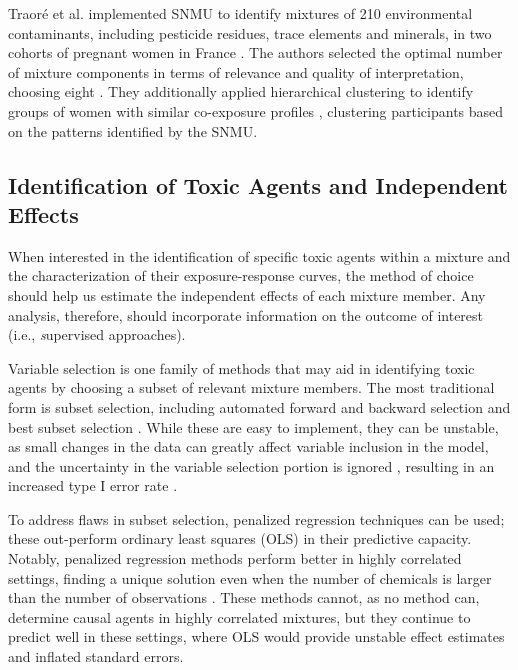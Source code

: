Traor\'{e} et al. implemented SNMU to identify mixtures of 210 environmental contaminants, including pesticide residues, trace elements and minerals, in two cohorts of pregnant women in France \citep{traore2018}. The authors selected the optimal number of mixture components in terms of relevance and quality of interpretation, choosing eight \citep{traore2018}. They additionally applied hierarchical clustering to identify groups of women with similar co-exposure profiles \citep{traore2018}, clustering participants based on the patterns identified by the SNMU.

\subsection{Identification of Toxic Agents and Independent Effects}\label{sec:Ind}

When interested in the identification of specific toxic agents within a mixture and the characterization of their exposure-response curves, the method of choice should help us estimate the independent effects of each mixture member. Any analysis, therefore, should incorporate information on the outcome of interest (i.e., {\textit supervised} approaches).

Variable selection is one family of methods that may aid in identifying toxic agents by choosing a subset of relevant mixture members. The most traditional form is subset selection, including automated forward and backward selection and best subset selection \citep{ISLR}. While these are easy to implement, they can be unstable, as small changes in the data can greatly affect variable inclusion in the model, and the uncertainty in the variable selection portion is ignored \citep{shen2002adaptive, fan2001variable}, resulting in an increased type I error rate \citep{leamer1978specification, raftery1996approximate, draper1995assessment}.

To address flaws in subset selection, penalized regression techniques can be used; these out-perform ordinary least squares (OLS) in their predictive capacity. Notably, penalized regression methods perform better in highly correlated settings, finding a unique solution even when the number of chemicals is larger than the number of observations \citep{fan2006statistical}. These methods cannot, as no method can, determine causal agents in highly correlated mixtures, but they continue to predict well in these settings, where OLS would provide unstable effect estimates and inflated standard errors. 

